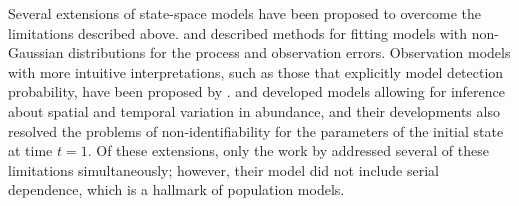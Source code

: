 \documentclass[12pt,english]{article}
\begin{document}
\begin{spacing}{1.9}
\begin{flushleft}

Several extensions of state-space models have been proposed to
overcome the limitations described above. \citet{devalpine_hastings:2002} and
\citet{brooks_etal:2004} described methods for fitting models with non-Gaussian
distributions for the process and observation errors. Observation models with
more intuitive interpretations, such as those that explicitly model
detection probability, have been proposed by 
\citet{kery_etal:2009}. \citet{lele_etal:1998} and 
\citet{kery_etal:2009} developed models allowing for inference about
spatial and temporal variation in abundance, and their developments
also resolved the problems of non-identifiability for the parameters
of the initial state at time $t=1$. Of these extensions, only
the work by \citet{kery_etal:2009} addressed several of these limitations
simultaneously; however, their model did not include serial
dependence, which is a hallmark of population models. %


\end{flushleft}
\end{spacing}
\end{document}
